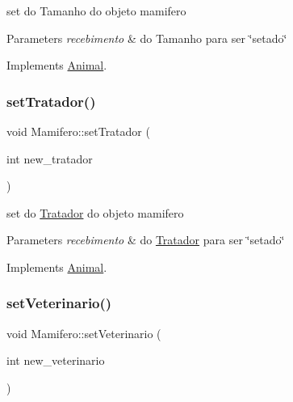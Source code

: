 set do Tamanho do objeto mamifero 


\begin{DoxyParams}{Parameters}
{\em recebimento} & do Tamanho para ser \char`\"{}setado\char`\"{} \\
\hline
\end{DoxyParams}


Implements \mbox{\hyperlink{class_animal}{Animal}}.

\mbox{\label{class_mamifero_ac1cfa5b28c2102e99ebee856afad63b1}} 
\subsubsection{\texorpdfstring{setTratador()}{setTratador()}}
{\footnotesize\ttfamily void Mamifero\+::set\+Tratador (\begin{DoxyParamCaption}\item[{int}]{new\+\_\+tratador }\end{DoxyParamCaption})\hspace{0.3cm}{\ttfamily [virtual]}}



set do \mbox{\hyperlink{class_tratador}{Tratador}} do objeto mamifero 


\begin{DoxyParams}{Parameters}
{\em recebimento} & do \mbox{\hyperlink{class_tratador}{Tratador}} para ser \char`\"{}setado\char`\"{} \\
\hline
\end{DoxyParams}


Implements \mbox{\hyperlink{class_animal}{Animal}}.

\mbox{\label{class_mamifero_a3b617e8eccf40e0af42bc8957491dfe6}} 
\subsubsection{\texorpdfstring{setVeterinario()}{setVeterinario()}}
{\footnotesize\ttfamily void Mamifero\+::set\+Veterinario (\begin{DoxyParamCaption}\item[{int}]{new\+\_\+veterinario }\end{DoxyParamCaption})\hspace{0.3cm}{\ttfamily [virtual]}}



